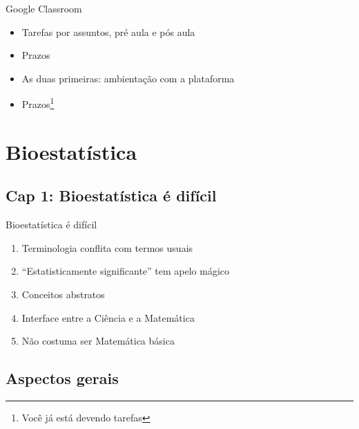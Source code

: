 \documentclass{beamer}
\begin{document}
\begin{frame}{Google Classroom}
  \begin{itemize}
  \item Tarefas por assuntos, pré aula e pós aula
  \item Prazos
  \item As duas primeiras: ambientação com a plataforma
  \item Prazos\footnote{Você já está devendo tarefas}
  \end{itemize}
\end{frame}

\section{Bioestatística}

\subsection{Cap 1: Bioestatística é difícil}

\begin{frame}{Bioestatística é difícil}
  \begin{enumerate}
  \item Terminologia conflita com termos usuais
  \item ``Estatisticamente significante'' tem apelo mágico
  \item Conceitos abstratos
  \item Interface entre a Ciência e a Matemática
  \item Não costuma ser Matemática básica
  \end{enumerate}
\end{frame}

\subsection{Aspectos gerais}
\end{document}

